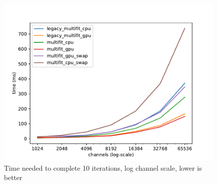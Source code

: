 \begin{figure}[H]
  \includegraphics[width=.75\textwidth]{img/logscale02}
  \caption{Time needed to complete 10 iterations, log channel scale, lower is better}
  \label{img:logscale02}
\end{figure}